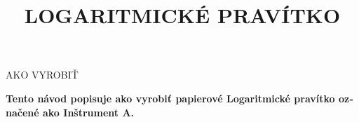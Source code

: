 
\usepackage{polyglossia}
\setdefaultlanguage{slovak}
\newcommand{\makefulltitle}{Ako vyrobiť Logaritmické pravítko }



\title{\fontsize{60}{60}\selectfont LOGARITMICKÉ PRAVÍTKO}
\preauthor{}\postauthor{}\author{}
\predate{}\postdate{}\date{}


  \begin{center}
    \headingfont\fontsize{20}{20}\selectfont AKO VYROBIŤ
  \end{center}

  {\let\newpage\relax\maketitle}%
  \nosection{}
  \large\textbf{\makeperex Tento návod popisuje ako vyrobiť papierové Logaritmické pravítko označené ako Inštrument A.}

